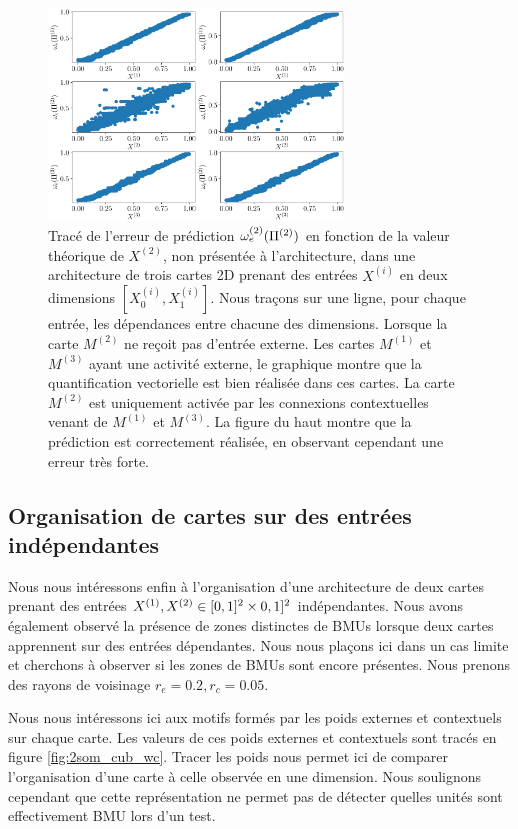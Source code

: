 \documentclass[../main]{subfiles}
\begin{document}
\begin{figure}
\centering\includegraphics[width=0.7\textwidth]{3som_error_2.pdf}
\caption{Tracé de l'erreur de prédiction $\omega_e^{({2})}(\Pi^{({2})})$ en fonction de la valeur théorique de $X^{(2)}$, non présentée à l'architecture, dans une architecture de trois cartes 2D prenant des entrées $X^{(i)}$ en deux dimensions $[X^{(i)}_0, X^{(i)}_1]$. Nous traçons sur une ligne, pour chaque entrée, les dépendances entre chacune des dimensions.
Lorsque la carte $M^{(2)}$ ne reçoit pas d'entrée externe. Les cartes $M^{(1)}$ et $M^{(3)}$ ayant une activité externe, le graphique montre que la quantification vectorielle est bien réalisée dans ces cartes. La carte $M^{(2)}$ est uniquement activée par les connexions contextuelles venant de $M^{(1)}$ et $M^{(3)}$. La figure du haut montre que la prédiction est correctement réalisée, en observant cependant une erreur très forte. \label{fig:3som_pred}}
\end{figure}

\subsection{Organisation de cartes sur des entrées indépendantes}

Nous nous intéressons enfin à l'organisation d'une architecture de deux cartes prenant des entrées $X^{({1})}, X^{({2})} \in [0,1]^2 \times 0,1]^2$ indépendantes.
Nous avons également observé la présence de zones distinctes de BMUs lorsque deux cartes apprennent sur des entrées dépendantes. Nous nous plaçons ici dans un cas limite et cherchons à observer si les zones de BMUs sont encore présentes.
Nous prenons des rayons de voisinage $r_e = 0.2, r_c = 0.05$.

Nous nous intéressons ici aux motifs formés par les poids externes et contextuels sur chaque carte.
Les valeurs de ces poids externes et contextuels sont tracés en figure \ref{fig:2som_cub_wc}.
Tracer les poids nous permet ici de comparer l'organisation d'une carte à celle observée en une dimension. Nous soulignons cependant que cette représentation ne permet pas de détecter quelles unités sont effectivement BMU lors d'un test.
\end{document}
